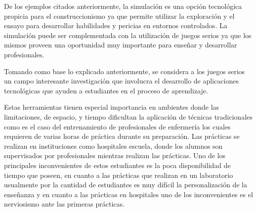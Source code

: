 De los ejemplos citados anteriormente, la simulación es una opción tecnológica
propicia para el construccionismo ya que permite utilizar la exploración y el
ensayo para desarrollar habilidades y pericias en entornos
controlados\cite{humphreys2013developing}. La simulación puede ser complementada
con la utilización de juegos serios ya que los mismos proveen una oportunidad
muy importante para enseñar y desarrollar profesionales\cite{sg:aoverview}.




Tomando como base lo explicado anteriormente, se considera a los juegos serios un campo 
interesante investigación que involucra el desarrollo de aplicaciones tecnológicas que
ayuden a estudiantes en el proceso de aprendizaje. 

Estas herramientas tienen especial importancia en ambientes donde las
limitaciones, de espacio, y tiempo dificultan
la aplicación de técnicas tradicionales como es el caso del entrenamiento
de profesionales de enfermería los cuales requieren de varias horas de práctica
durante su preparación. Las prácticas se realizan en instituciones como hospitales
escuela, donde los alumnos son supervisados por profesionales mientras realizan
las prácticas. Uno de los principales inconvenientes de estos estudiantes es 
la poca disponibilidad de tiempo que poseen, en cuanto a las prácticas que 
realizan en un laboratorio usualmente por la cantidad de estudiantes es muy 
difícil la personalización de la enseñanza y en cuanto a las prácticas en 
hospitales uno de los inconvenientes es el nerviosismo ante las primeras prácticas.

